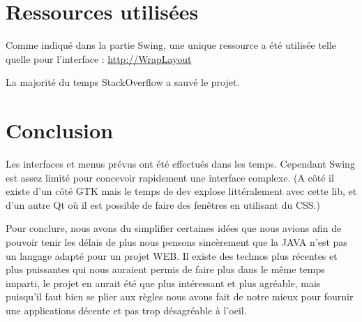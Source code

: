 \documentclass{article}
\begin{document}
\section{Ressources utilisées}

Comme indiqué dans la partie Swing, une unique ressource a été utilisée telle quelle pour l'interface : 
\href{http://tips4java.wordpress.com/2008/11/06/wrap-layout/}{http://WrapLayout}

La majorité du temps StackOverflow a sauvé le projet.
 
\section{Conclusion}

Les interfaces et menus prévus ont été effectués dans les temps. Cependant Swing est assez limité pour concevoir rapidement une interface complexe. (A côté il existe d'un côté GTK mais le temps de dev explose littéralement avec cette lib, et d'un autre Qt où il est possible de faire des fenêtres en utilisant du CSS.)

Pour conclure, nous avons du simplifier certaines idées que nous avions afin de pouvoir tenir les délais de plus nous pensons sincèrement que la JAVA n'est pas un langage adapté pour un projet WEB. Il existe des technos plus récentes et plus puissantes qui nous auraient permis de faire plus dans le même temps imparti, le projet en aurait été que plus intéressant et plus agréable, mais puisqu'il faut bien se plier aux règles nous avons fait de notre mieux pour fournir une applications décente et pas trop désagréable à l'oeil. 
\end{document}
